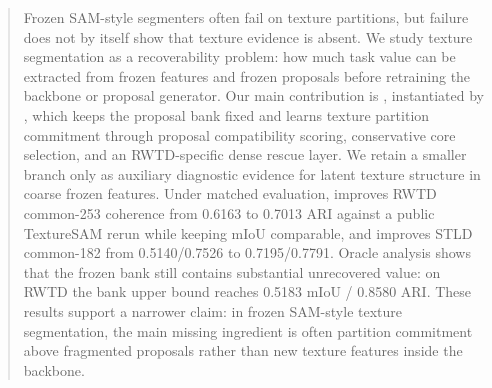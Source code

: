 \begin{abstract}
Frozen SAM-style segmenters often fail on texture partitions, but failure does not by itself show that texture evidence is absent. We study texture segmentation as a recoverability problem: how much task value can be extracted from frozen features and frozen proposals before retraining the backbone or proposal generator. Our main contribution is \proproute{}, instantiated by \sys{}, which keeps the proposal bank fixed and learns texture partition commitment through proposal compatibility scoring, conservative core selection, and an RWTD-specific dense rescue layer. We retain a smaller \featroute{} branch only as auxiliary diagnostic evidence for latent texture structure in coarse frozen features. Under matched evaluation, \sys{} improves RWTD common-253 coherence from 0.6163 to 0.7013 ARI against a public TextureSAM rerun while keeping mIoU comparable, and improves STLD common-182 from 0.5140/0.7526 to 0.7195/0.7791. Oracle analysis shows that the frozen bank still contains substantial unrecovered value: on RWTD the bank upper bound reaches 0.5183 mIoU / 0.8580 ARI. These results support a narrower claim: in frozen SAM-style texture segmentation, the main missing ingredient is often partition commitment above fragmented proposals rather than new texture features inside the backbone.
\end{abstract}
